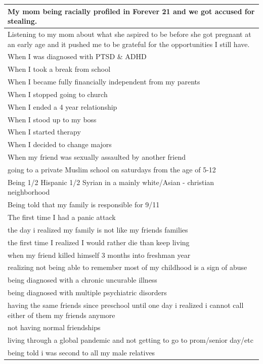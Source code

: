\documentclass[
  .7em,
  letterpaper,
  DIV=11,
  numbers=noendperiod]{scrartcl}
\begin{document}
\begin{table}
\begin{tabular}{l}
\hline
My mom being racially profiled in Forever 21 and we got accused for stealing.\\
\hline
Listening to my mom about what she aspired to be before she got pregnant at an early age and it pushed me to be grateful for the opportunities I still have.\\
\hline
When I was diagnosed with PTSD \& ADHD\\
\hline
When I took a break from school\\
\hline
When I became fully financially independent from my parents\\
\hline
When I stopped going to church\\
\hline
When I ended a 4 year relationship\\
\hline
When I stood up to my boss\\
\hline
When I started therapy\\
\hline
When I decided to change majors\\
\hline
When my friend was sexually assaulted by another friend\\
\hline
going to a private Muslim school on saturdays from the age of 5-12\\
\hline
Being 1/2 Hispanic 1/2 Syrian in a mainly white/Asian - christian neighborhood\\
\hline
Being told that my family is responsible for 9/11\\
\hline
The first time I had a panic attack\\
\hline
the day i realized my family is not like my friends families\\
\hline
the first time I realized I would rather die than keep living\\
\hline
when my friend killed himself 3 months into freshman year\\
\hline
realizing not being able to remember most of my childhood is a sign of abuse\\
\hline
being diagnosed with a chronic uncurable illness\\
\hline
being diagnosed with multiple psychiatric disorders\\
\hline
having the same friends since preschool until one day i realized i cannot call either of them my friends anymore\\
\hline
not having normal friendships\\
\hline
living through a global pandemic and not getting to go to prom/senior day/etc\\
\hline
being told i was second to all my male relatives\\

\end{tabular}
\end{table}
\end{document}
